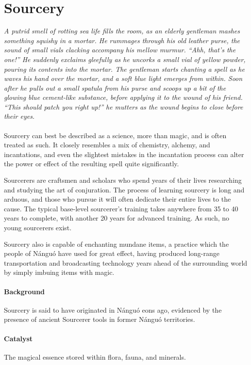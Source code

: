 \newpage\section{Sourcery}
\textit{A putrid smell of rotting sea life fills the room, as an elderly gentleman mashes something squishy in a mortar.
He rummages through his old leather purse, the sound of small vials clacking accompany his mellow murmur.
``Ahh, that's the one!'' He suddenly exclaims gleefully as he uncorks a small vial of yellow powder, pouring its contents into the mortar.
The gentleman starts chanting a spell as he waves his hand over the mortar, and a soft blue light emerges from within.
Soon after he pulls out a small spatula from his purse and scoops up a bit of the glowing blue cement-like substance, before applying it to the wound of his friend.
``This should patch you right up!'' he mutters as the wound begins to close before their eyes.}\\\\
Sourcery can best be described as a science, more than magic, and is often treated as such.
It closely resembles a mix of chemistry, alchemy, and incantations, and even the slightest mistakes in the incantation process can alter the power or effect of the resulting spell quite significantly.

Sourcerers are craftsmen and scholars who spend years of their lives researching and studying the art of conjuration.
The process of learning sourcery is long and arduous, and those who pursue it will often dedicate their entire lives to the cause.
The typical base-level sourcerer's training takes anywhere from 35 to 40 years to complete, with another 20 years for advanced training.
As such, no young sourcerers exist.

Sourcery also is capable of enchanting mundane items, a practice which the people of N\'angu\'o have used for great effect, 
having produced long-range transportation and broadcasting technology years ahead of the surrounding world by simply imbuing items with magic.

\paragraph{Background} Sourcery is said to have originated in N\'angu\'o eons ago, evidenced by the presence of ancient Sourcerer tools in former N\'angu\'o territories.

\paragraph{Catalyst} The magical essence stored within flora, fauna, and minerals.
